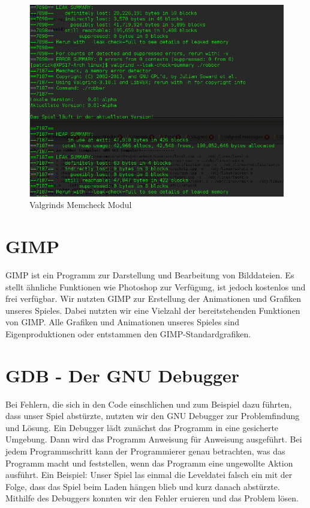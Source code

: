 \documentclass[11pt,a4paper]{scrbook}
\begin{document}
\begin{figure}
\centering
\includegraphics[scale=0.5]{img/valgrind2.png}
\caption{Valgrinds Memcheck Modul}
\end{figure}


\section{GIMP}
GIMP ist ein Programm zur Darstellung und Bearbeitung von Bilddateien.
Es stellt ähnliche Funktionen wie Photoshop zur Verfügung, ist jedoch kostenlos und frei verfügbar.
Wir nutzten GIMP zur Erstellung der Animationen und Grafiken unseres Spieles.
Dabei nutzten wir eine Vielzahl der bereitstehenden Funktionen von GIMP.
Alle Grafiken und Animationen unseres Spieles sind Eigenproduktionen oder entstammen den GIMP-Standardgrafiken.

\section{GDB - Der GNU Debugger}
Bei Fehlern, die sich in den Code einschlichen und zum Beispiel dazu führten, dass unser Spiel abstürzte, nutzten wir den GNU Debugger zur Problemfindung und Lösung. Ein Debugger lädt zunächst das Programm in eine gesicherte Umgebung. Dann wird das Programm Anweisung für Anweisung ausgeführt. Bei jedem Programmschritt kann der Programmierer genau betrachten, was das Programm macht und feststellen, wenn das Programm eine ungewollte Aktion ausführt. Ein Beispiel: Unser Spiel las einmal die Leveldatei falsch ein mit der Folge, dass das Spiel beim Laden hängen blieb und kurz danach abstürzte. Mithilfe des Debuggers konnten wir den Fehler eruieren und das Problem lösen. 
\end{document}
